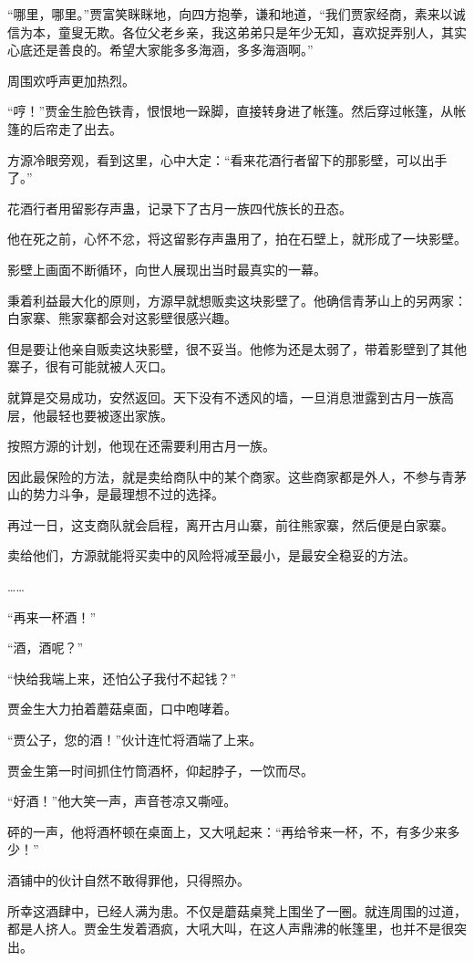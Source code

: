 \begin{this_body}
“哪里，哪里。”贾富笑眯眯地，向四方抱拳，谦和地道，“我们贾家经商，素来以诚信为本，童叟无欺。各位父老乡亲，我这弟弟只是年少无知，喜欢捉弄别人，其实心底还是善良的。希望大家能多多海涵，多多海涵啊。”

周围欢呼声更加热烈。

“哼！”贾金生脸色铁青，恨恨地一跺脚，直接转身进了帐篷。然后穿过帐篷，从帐篷的后帘走了出去。

方源冷眼旁观，看到这里，心中大定：“看来花酒行者留下的那影壁，可以出手了。”

花酒行者用留影存声蛊，记录下了古月一族四代族长的丑态。

他在死之前，心怀不忿，将这留影存声蛊用了，拍在石壁上，就形成了一块影壁。

影壁上画面不断循环，向世人展现出当时最真实的一幕。

秉着利益最大化的原则，方源早就想贩卖这块影壁了。他确信青茅山上的另两家：白家寨、熊家寨都会对这影壁很感兴趣。

但是要让他亲自贩卖这块影壁，很不妥当。他修为还是太弱了，带着影壁到了其他寨子，很有可能就被人灭口。

就算是交易成功，安然返回。天下没有不透风的墙，一旦消息泄露到古月一族高层，他最轻也要被逐出家族。

按照方源的计划，他现在还需要利用古月一族。

因此最保险的方法，就是卖给商队中的某个商家。这些商家都是外人，不参与青茅山的势力斗争，是最理想不过的选择。

再过一日，这支商队就会启程，离开古月山寨，前往熊家寨，然后便是白家寨。

卖给他们，方源就能将买卖中的风险将减至最小，是最安全稳妥的方法。

……

“再来一杯酒！”

“酒，酒呢？”

“快给我端上来，还怕公子我付不起钱？”

贾金生大力拍着蘑菇桌面，口中咆哮着。

“贾公子，您的酒！”伙计连忙将酒端了上来。

贾金生第一时间抓住竹筒酒杯，仰起脖子，一饮而尽。

“好酒！”他大笑一声，声音苍凉又嘶哑。

砰的一声，他将酒杯顿在桌面上，又大吼起来：“再给爷来一杯，不，有多少来多少！”

酒铺中的伙计自然不敢得罪他，只得照办。

所幸这酒肆中，已经人满为患。不仅是蘑菇桌凳上围坐了一圈。就连周围的过道，都是人挤人。贾金生发着酒疯，大吼大叫，在这人声鼎沸的帐篷里，也并不是很突出。


\end{this_body}
